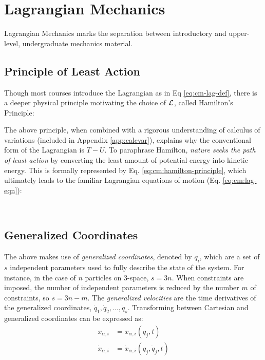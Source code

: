 \newpage
\section{Lagrangian Mechanics}
\label{sec:cm-lagrangian}

Lagrangian Mechanics marks the separation between introductory and upper-level, undergraduate mechanics material. 
\subsection{Principle of Least Action}
Though most courses introduce the Lagrangian as in Eq \ref{eq:cm-lag-def}, there is a deeper physical principle  motivating the choice of $\mathcal{L}$, called Hamilton's Principle: 

The above principle, when combined with a rigorous understanding of calculus of variations (included in Appendix \ref{app:calcvar}), explains why the conventional form of the Lagrangian is $T - U$. To paraphrase Hamilton, \textit{nature seeks the path of least action} by converting the least amount of potential energy into kinetic energy. This is formally represented by Eq. \ref{eq:cm:hamilton-principle}, which ultimately leads to the familiar Lagrangian equations of motion (Eq. \ref{eq:cm:lag-eqn}):

\

\subsection{Generalized Coordinates}
The above makes use of \textit{generalized coordinates}, denoted by $q_i$, which are a set of $s$ independent parameters used to fully describe the state of the system. For instance, in the case of $n$ particles on 3-space, $s = 3n$. When constraints are imposed, the number of independent parameters is reduced by the number $m$ of constraints, so $s = 3n - m$. The \textit{generalized velocities} are the time derivatives of the generalized coordinates, $\dot{q}_1, \dot{q}_2, ..., \dot{q}_s$. Transforming between Cartesian and generalized coordinates can be expressed as:
\begin{equation}
\begin{split}
		x_{\alpha,i} &= x_{\alpha, i}(q_j, t) \\
		\dot{x}_{\alpha,i} &= \dot{x}_{\alpha, i}(q_j, \dot{q}_j, t) 
\end{split}	
\end{equation}

